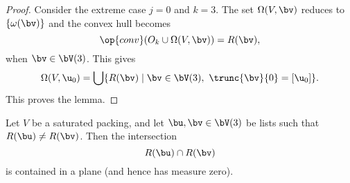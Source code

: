 \begin{proof}
Consider  the extreme case $j=0$ and $k=3$.  The set $\Omega(V,\bv)$
reduces to $\{\omega(\bv)\}$  and the convex hull becomes
\begin{displaymath} 
\op{conv}(O_{k}\cup \Omega(V,\bv)) = R(\bv),
\end{displaymath}
when $\bv\in \bV(3)$.
This gives
\begin{equation} 
\Omega(V,\u_0) = 
\bigcup \{ R(\bv) \mid \bv\in \bV(3),~\trunc{\bv}{0} =[\u_0]\}.
\end{equation}
This proves the lemma.
\end{proof}



\begin{lemma}[]  \label{lemma:R-inter} 
Let $V$ be a saturated packing, and let $\bu,\bv\in \bV(3)$ be lists such that 
$R(\bu)\ne R(\bv)$.  Then the intersection 
\begin{displaymath} 
R(\bu)\cap R(\bv)
\end{displaymath}
is contained in a plane (and hence has measure zero).
\end{lemma}

